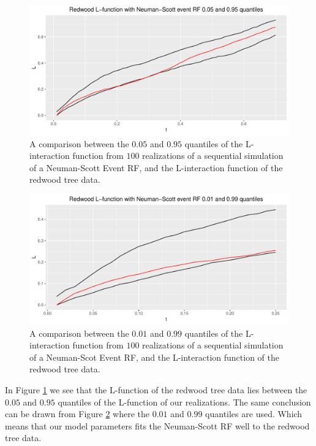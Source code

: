 \begin{figure}
    \centering
    \includegraphics[scale=0.65]{figures/ns_quant1.pdf}
    \caption{A comparison between the $0.05$ and $0.95$ quantiles of the L-interaction function from $100$ realizations of a sequential simulation of a Neuman-Scott Event RF, and the L-interaction function of the redwood tree data.}
    \label{fig:ns_quant1}
\end{figure}

\begin{figure}
    \centering
    \includegraphics[scale=0.65]{figures/ns_quant2.pdf}
    \caption{A comparison between the $0.01$ and $0.99$ quantiles of the L-interaction function from $100$ realizations of a sequential simulation of a Neuman-Scot Event RF, and the L-interaction function of the redwood tree data.}
    \label{fig:ns_quant2}
\end{figure}

In Figure \ref{fig:ns_quant1} we see that the L-function of the redwood tree data lies between the $0.05$ and $0.95$ quantiles of the L-function of our realizations. The same conclusion can be drawn from Figure \ref{fig:ns_quant2} where the $0.01$ and $0.99$ quantiles are used. Which means that our model parameters fits the Neuman-Scott RF well to the redwood tree data. 